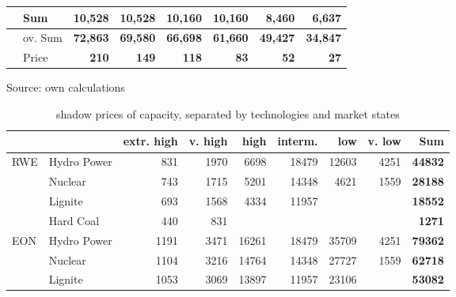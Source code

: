 \begin{table}[htb]
\begin{tabular}{llrrrrrr}
           &  {\bf Sum} & {\bf 10,528} & {\bf 10,528} & {\bf 10,160} & {\bf 10,160} & {\bf 8,460} & {\bf 6,637} \\
\hline
           &    ov. Sum & {\bf 72,863} & {\bf 69,580} & {\bf 66,698} & {\bf 61,660} & {\bf 49,427} & {\bf 34,847} \\
\hline
           &      Price &  {\bf 210} &  {\bf 149} &  {\bf 118} &   {\bf 83} &   {\bf 52} &   {\bf 27} \\
\hline
\hline
\end{tabular}
\label{tab:statquant}
\begin{center}
Source: own calculations
\end{center}
\end{table}

\clearpage
\newpage
\begin{table}[htb]
\centering
\caption{shadow prices of capacity, separated by technologies and market states}
\begin{tabular}{llrrrrrrr}
\hline
           &            & extr. high &    v. high &       high &    interm. &        low &     v. low &  {\bf Sum} \\
\hline
       RWE & Hydro Power &        831 &       1970 &       6698 &      18479 &      12603 &       4251 & {\bf 44832} \\

           &    Nuclear &        743 &       1715 &       5201 &      14348 &       4621 &       1559 & {\bf 28188} \\

           &    Lignite &        693 &       1568 &       4334 &      11957 &            &            & {\bf 18552} \\

           &  Hard Coal &        440 &        831 &            &            &            &            & {\bf 1271} \\
\hline
       EON & Hydro Power &       1191 &       3471 &      16261 &      18479 &      35709 &       4251 & {\bf 79362} \\

           &    Nuclear &       1104 &       3216 &      14764 &      14348 &      27727 &       1559 & {\bf 62718} \\

           &    Lignite &       1053 &       3069 &      13897 &      11957 &      23106 &            & {\bf 53082} \\


\end{tabular}
\end{table}
